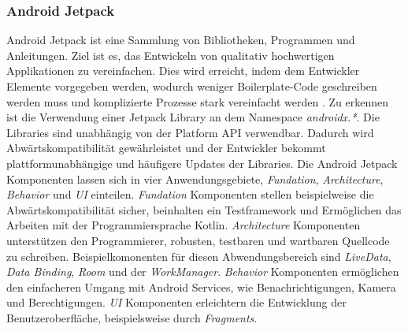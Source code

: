 \documentclass[a4paper]{article}
\begin{document}
\subsubsection{Android Jetpack}
\label{subsubsec:technologies:bibs:jetpack}
Android Jetpack ist eine Sammlung von Bibliotheken, Programmen und Anleitungen. Ziel ist es, das Entwickeln von qualitativ hochwertigen Applikationen zu vereinfachen. Dies wird erreicht, indem dem Entwickler Elemente vorgegeben werden, wodurch weniger Boilerplate-Code geschreiben werden muss und komplizierte Prozesse stark vereinfacht werden \cite{android_jetpack}. Zu erkennen ist die Verwendung einer Jetpack Library an dem Namespace \textit{androidx.*}. Die Libraries sind unabhängig von der Platform API verwendbar. Dadurch wird Abwärtskompatibilität gewährleistet und der Entwickler bekommt plattformunabhängige und häufigere Updates der Libraries. Die Android Jetpack Komponenten lassen sich in vier Anwendungsgebiete, \textit{Fundation}, \textit{Architecture}, \textit{Behavior} und \textit{UI} einteilen. \textit{Fundation} Komponenten stellen beispielweise die Abwärtskompatibilität sicher, beinhalten ein Testframework und Ermöglichen das Arbeiten mit der Programmiersprache Kotlin. \textit{Architecture} Komponenten unterstützen den Programmierer, robusten, testbaren und wartbaren Quellcode zu schreiben. Beispielkomonenten für diesen Abwendungsbereich sind \textit{LiveData}, \textit{Data Binding}, \textit{Room} und der \textit{WorkManager}. \textit{Behavior} Komponenten ermöglichen den einfacheren Umgang mit Android Services, wie Benachrichtigungen, Kamera und Berechtigungen. \textit{UI} Komponenten erleichtern die Entwicklung der Benutzeroberfläche, beispielsweise durch \textit{Fragments}.
\end{document}
